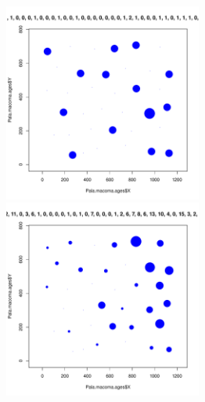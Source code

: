 \documentclass[12pt, a4paper]{disser}
\begin{document}
	\begin{figure}[h]

	\begin{minipage}[b]{.46\linewidth}
	\begin{center}
		\includegraphics[width=65mm]{./Pala_macoma_age_bubb_N1_.pdf}
	\end{center}
	\end{minipage}
%
	\hfil %
%
	\begin{minipage}[b]{.46\linewidth}
	\begin{center}
		\includegraphics[width=65mm]{./Pala_macoma_age_bubb_N2_.pdf}
	\end{center}
	\end{minipage}


\end{figure}
\end{document}
